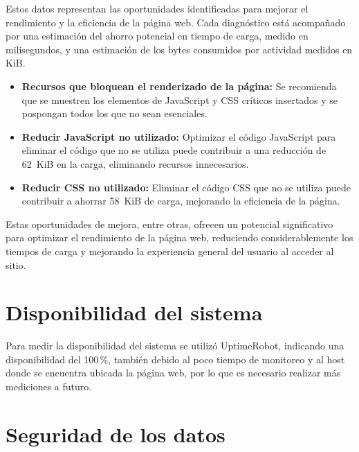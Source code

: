 \documentclass[12pt,a4paper]{article}
\begin{document}
Estos datos representan las oportunidades identificadas para mejorar el rendimiento y la
eficiencia de la página web. Cada diagnóstico está acompañado por una estimación del
ahorro potencial en tiempo de carga, medido en milisegundos, y una estimación de los bytes
consumidos por actividad medidos en KiB.

\begin{itemize}
  \item \textbf{Recursos que bloquean el renderizado de la página:} Se recomienda que se muestren los
        elementos de JavaScript y CSS críticos insertados y se pospongan todos los que no sean
        esenciales.
  \item \textbf{Reducir JavaScript no utilizado:} Optimizar el código JavaScript para eliminar el código que
        no se utiliza puede contribuir a una reducción de 62~KiB en la carga, eliminando recursos
        innecesarios.
  \item \textbf{Reducir CSS no utilizado:} Eliminar el código CSS que no se
        utiliza puede contribuir a ahorrar 58~KiB de carga, mejorando la eficiencia de la página.
\end{itemize}

Estas oportunidades de mejora, entre otras, ofrecen un potencial significativo para optimizar
el rendimiento de la página web, reduciendo considerablemente los tiempos de carga y
mejorando la experiencia general del usuario al acceder al sitio.

\section{Disponibilidad del sistema}

Para medir la disponibilidad del sistema se utilizó UptimeRobot, indicando una
disponibilidad del 100\,\%, también debido al poco tiempo de monitoreo y al host donde se
encuentra ubicada la página web, por lo que es necesario realizar más mediciones a futuro.

\section{Seguridad de los datos}
\end{document}
